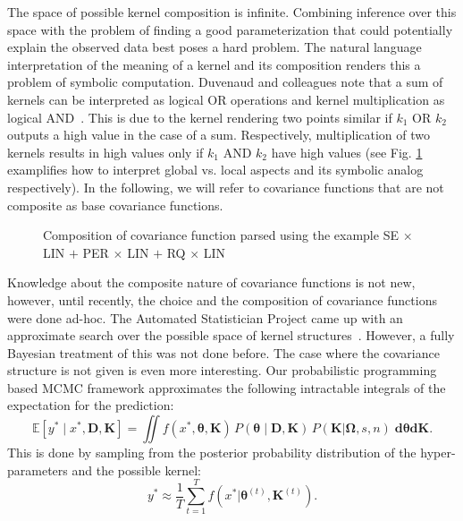 The space of possible kernel composition is infinite. Combining inference over this space with the problem of finding a good parameterization that could potentially explain the observed data best poses a hard problem. The natural language interpretation of the meaning of a kernel and its composition renders this a problem of symbolic computation. Duvenaud and colleagues note that a sum of kernels can be interpreted as logical OR operations and kernel multiplication as logical AND~\citeyearpar{duvenaud2013structure}. This is due to the kernel rendering two points similar if $k_1$ OR $k_2$ outputs a high value in the case of a sum. Respectively, multiplication of two kernels results in high values only if $k_1$ AND $k_2$ have high values (see Fig. \ref{fig:composite} examplifies how to interpret global vs. local aspects and its symbolic analog respectively). 
In the following, we will refer to covariance functions that are not composite as base covariance functions.

\begin{figure}
\centering

\caption{Composition of covariance function parsed using the example SE $\times$ LIN $+$ PER $\times$ LIN $+$  RQ $\times$ LIN}\label{fig:composite}
\end{figure}


Knowledge about the composite nature of covariance functions is not new, however, until recently, the choice and the composition of covariance functions were done ad-hoc. The Automated Statistician Project came up with an approximate search over the possible space of kernel structures~\citep{duvenaud2013structure,lloyd2014automatic}. However, a fully Bayesian treatment of this was not done before.
The case where the covariance structure is not given is even more interesting. Our probabilistic programming based MCMC framework approximates the following intractable integrals of the expectation for the prediction:
\begin{equation}
\mathbb{E}[y^* \mid x^*,\mathbf{D},\mathbf{K}] =\iint f(x^*,\bm{\theta},\mathbf{K})\,P(\bm{\theta} \mid \mathbf{D,\mathbf{K}})\,P(\mathbf{K}|\bm{\Omega},s,n) \; \mathbf{d} \bm{\theta} \mathbf{d} \mathbf{K}.  
\end{equation}
This is done by sampling from the posterior probability distribution of the hyper-parameters and the possible kernel:
\begin{equation}
y^* \approx \frac{1}{T} \sum^T_{t=1} f(x^* | \bm{\theta}^{(t)},\mathbf{K}^{(t)}). 
\end{equation}


